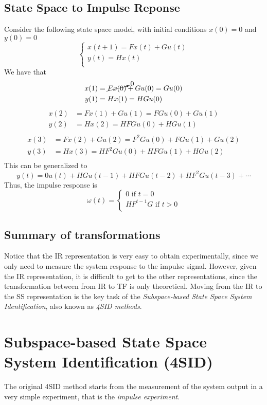 \subsection{State Space to Impulse Reponse}
Consider the following state space model, with initial conditions $x(0) = 0$ and $y(0) = 0$
\[
    \begin{cases}
        x(t+1) = F x(t) + G u(t)\\
        y(t) = H x(t)\\
    \end{cases}
\]
We have that
\begin{align*}
    x(1) &= \cancelto{0}{F x(0)} + G u(0) = G u(0)\\
    y(1) &= H x(1) = H G u(0)\\
\end{align*}
\begin{align*}
    x(2) &= F x(1) + G u(1) = F G u(0) + G u(1)\\
    y(2) &= H x(2) = H F G u(0) + H G u(1)\\
\end{align*}
\begin{align*}
    x(3) &= F x(2) + G u(2) = F^2 G u(0) + F G u(1) + G u(2)\\
    y(3) &= H x(3) = H F^2 G u(0) + H F G u(1) + H G u(2)\\
\end{align*}
This can be generalized to
\[ y(t) = 0 u(t) + H G u(t-1) + H F G u(t-2) + H F^2 G u(t-3) + \cdots \]
Thus, the impulse response is
\[
    \omega(t) =
    \begin{cases}
        0 \text{ if } t = 0\\
        H F^{t-1} G \text{ if } t > 0\\
    \end{cases}
\]

\subsection{Summary of transformations}
Notice that the IR representation is very easy to obtain experimentally, since we only need to measure the system response to the impulse signal.
However, given the IR representation, it is difficult to get to the other representations, since the transformation between from IR to TF is only theoretical.
Moving from the IR to the SS representation is the key task of the \emph{Subspace-based State Space System Identification}, also known as \emph{4SID methods}.

\section{Subspace-based State Space System Identification (4SID)}
The original 4SID method starts from the measurement of the system output in a very simple experiment, that is the \emph{impulse experiment}.

